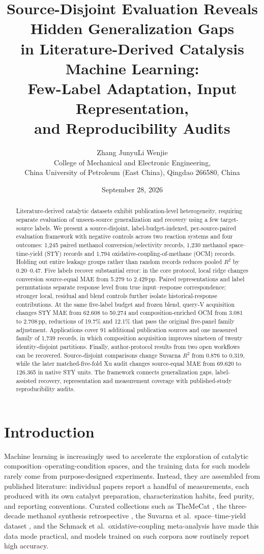 \documentclass[11pt,a4paper]{article}
\title{\textbf{Source-Disjoint Evaluation Reveals Hidden Generalization Gaps\\
in Literature-Derived Catalysis Machine Learning:\\
Few-Label Adaptation, Input Representation,\\
and Reproducibility Audits}}
\author{Zhang Junyu\quad Li Wenjie\\[2pt]
\small College of Mechanical and Electronic Engineering,\\
\small China University of Petroleum (East China), Qingdao 266580, China}
\date{September 28, 2026}
\newcommand{\pp}{\,pp}
\begin{document}
\maketitle

\begin{abstract}
Literature-derived catalytic datasets exhibit publication-level heterogeneity, requiring separate evaluation of unseen-source generalization and recovery using a few target-source labels.
We present a source-disjoint, label-budget-indexed, per-source-paired evaluation framework with negative controls across two reaction systems and four outcomes:
1,245 paired methanol conversion/selectivity records, 1,230 methanol space--time-yield (STY) records and 1,794 oxidative-coupling-of-methane (OCM) records.
Holding out entire leakage groups rather than random records reduces pooled $R^2$ by 0.20--0.47.
Five labels recover substantial error: in the core protocol, local ridge changes conversion source-equal MAE from 5.279 to 2.429\pp{}.
Paired representations and label permutations separate response level from true input--response correspondence; stronger local, residual and blend controls further isolate historical-response contributions.
At the same five-label budget and frozen blend, query-V acquisition changes STY MAE from 62.608 to 50.274 and composition-enriched OCM from 3.081 to 2.708\pp{}, reductions of 19.7\% and 12.1\% that pass the original five-panel family adjustment.
Applications cover 91 additional publication sources and one measured family of 1,739 records, in which composition acquisition improves nineteen of twenty identity-disjoint partitions.
Finally, author-protocol results from two open workflows can be recovered. Source-disjoint comparisons change Suvarna $R^2$ from 0.876 to 0.319, while the later matched-five-fold Xu audit changes source-equal MAE from 69.620 to 126.365 in native STY units.
The framework connects generalization gaps, label-assisted recovery, representation and measurement coverage with published-study reproducibility audits.
\end{abstract}

\section{Introduction}
Machine learning is increasingly used to accelerate the exploration of catalytic
composition--operating-condition spaces, and the training data for such models rarely come
from purpose-designed experiments. Instead, they are assembled from published literature:
individual papers report a handful of measurements, each produced with its own catalyst
preparation, characterization habits, feed purity, and reporting conventions. Curated
collections such as TheMeCat \cite{toldy}, the three-decade methanol synthesis
retrospective \cite{yan}, the Suvarna et al.\ space--time-yield dataset
\cite{suvarna}, and the Schmack et al.\ oxidative-coupling meta-analysis
\cite{schmack} have made this data mode practical, and models trained on such corpora
now routinely report high accuracy.
\end{document}
